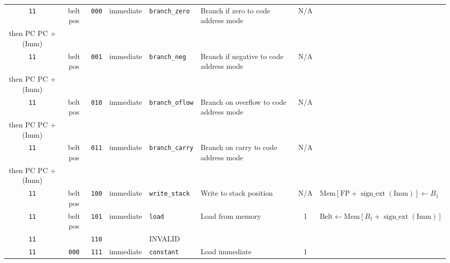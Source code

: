 \documentclass{article}
\begin{document}
\begin{landscape}
\begin{longtable}{c c c c l l c l}
		\texttt{11} & belt pos & \texttt{000} & immediate & \texttt{branch\_zero}  & Branch if zero to code address mode & N/A &
			\(\begin{array}{l}
				\textrm{If } B_1 = 0 \textrm{,} \\
				\textrm{then } \textrm{PC} \gets \textrm{PC} + \operatorname{sign\_ext}\left(\textrm{Imm}\right)
			\end{array}\) \\
		\texttt{11} & belt pos & \texttt{001} & immediate & \texttt{branch\_neg}   & Branch if negative to code address mode & N/A &
			\(\begin{array}{l}
				\textrm{If } B_1\left[15\right] = 1 \textrm{,} \\
				\textrm{then } \textrm{PC} \gets \textrm{PC} + \operatorname{sign\_ext}\left(\textrm{Imm}\right)
			\end{array}\) \\
		\texttt{11} & belt pos & \texttt{010} & immediate & \texttt{branch\_oflow} & Branch on overflow to code address mode & N/A &
			\(\begin{array}{l}
				\textrm{If } \operatorname{overflow}\left(B_1\right) = 1 \textrm{,} \\
				\textrm{then } \textrm{PC} \gets \textrm{PC} + \operatorname{sign\_ext}\left(\textrm{Imm}\right)
			\end{array}\) \\
		\texttt{11} & belt pos & \texttt{011} & immediate & \texttt{branch\_carry} & Branch on carry to code address mode    & N/A &
			\(\begin{array}{l}
				\textrm{If } \operatorname{carry}\left(B_1\right) = 1 \textrm{,} \\
				\textrm{then } \textrm{PC} \gets \textrm{PC} + \operatorname{sign\_ext}\left(\textrm{Imm}\right)
			\end{array}\) \\
		\texttt{11} & belt pos & \texttt{100} & immediate & \texttt{write\_stack}  & Write to stack position & N/A &
			\(\textrm{Mem}\left[\textrm{FP} + \operatorname{sign\_ext}\left(\textrm{Imm}\right)\right] \gets B_1\) \\
		\texttt{11} & belt pos & \texttt{101} & immediate & \texttt{load}          & Load from memory        & 1   &
			\(\textrm{Belt} \gets \textrm{Mem}\left[B_1 + \operatorname{sign\_ext}\left(\textrm{Imm}\right)\right]\) \\
		\texttt{11} & & \texttt{110} & & INVALID & \\
		\texttt{11} & \texttt{000} & \texttt{111} & immediate & \texttt{constant}    & Load immediate            & 1   &

\end{longtable}
\end{landscape}
\end{document}
